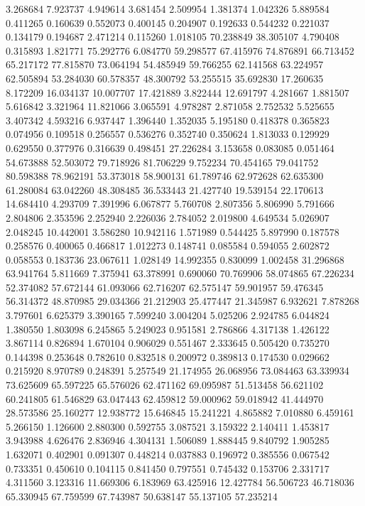 3.268684
7.923737
4.949614
3.681454
2.509954
1.381374
1.042326
5.889584
0.411265
0.160639
0.552073
0.400145
0.204907
0.192633
0.544232
0.221037
0.134179
0.194687
2.471214
0.115260
1.018105
70.238849
38.305107
4.790408
0.315893
1.821771
75.292776
6.084770
59.298577
67.415976
74.876891
66.713452
65.217172
77.815870
73.064194
54.485949
59.766255
62.141568
63.224957
62.505894
53.284030
60.578357
48.300792
53.255515
35.692830
17.260635
8.172209
16.034137
10.007707
17.421889
3.822444
12.691797
4.281667
1.881507
5.616842
3.321964
11.821066
3.065591
4.978287
2.871058
2.752532
5.525655
3.407342
4.593216
6.937447
1.396440
1.352035
5.195180
0.418378
0.365823
0.074956
0.109518
0.256557
0.536276
0.352740
0.350624
1.813033
0.129929
0.629550
0.377976
0.316639
0.498451
27.226284
3.153658
0.083085
0.051464
54.673888
52.503072
79.718926
81.706229
9.752234
70.454165
79.041752
80.598388
78.962191
53.373018
58.900131
61.789746
62.972628
62.635300
61.280084
63.042260
48.308485
36.533443
21.427740
19.539154
22.170613
14.684410
4.293709
7.391996
6.067877
5.760708
2.807356
5.806990
5.791666
2.804806
2.353596
2.252940
2.226036
2.784052
2.019800
4.649534
5.026907
2.048245
10.442001
3.586280
10.942116
1.571989
0.544425
5.897990
0.187578
0.258576
0.400065
0.466817
1.012273
0.148741
0.085584
0.594055
2.602872
0.058553
0.183736
23.067611
1.028149
14.992355
0.830099
1.002458
31.296868
63.941764
5.811669
7.375941
63.378991
0.690060
70.769906
58.074865
67.226234
52.374082
57.672144
61.093066
62.716207
62.575147
59.901957
59.476345
56.314372
48.870985
29.034366
21.212903
25.477447
21.345987
6.932621
7.878268
3.797601
6.625379
3.390165
7.599240
3.004204
5.025206
2.924785
6.044824
1.380550
1.803098
6.245865
5.249023
0.951581
2.786866
4.317138
1.426122
3.867114
0.826894
1.670104
0.906029
0.551467
2.333645
0.505420
0.735270
0.144398
0.253648
0.782610
0.832518
0.200972
0.389813
0.174530
0.029662
0.215920
8.970789
0.248391
5.257549
21.174955
26.068956
73.084463
63.339934
73.625609
65.597225
65.576026
62.471162
69.095987
51.513458
56.621102
60.241805
61.546829
63.047443
62.459812
59.000962
59.018942
41.444970
28.573586
25.160277
12.938772
15.646845
15.241221
4.865882
7.010880
6.459161
5.266150
1.126600
2.880300
0.592755
3.087521
3.159322
2.140411
1.453817
3.943988
4.626476
2.836946
4.304131
1.506089
1.888445
9.840792
1.905285
1.632071
0.402901
0.091307
0.448214
0.037883
0.196972
0.385556
0.067542
0.733351
0.450610
0.104115
0.841450
0.797551
0.745432
0.153706
2.331717
4.311560
3.123316
11.669306
6.183969
63.425916
12.427784
56.506723
46.718036
65.330945
67.759599
67.743987
50.638147
55.137105
57.235214
